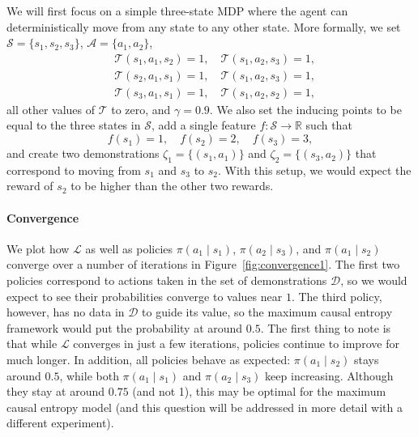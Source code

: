 \documentclass{mpaper}
\newcommand{\pione}{\pi(a_1 \mid s_1)}
\newcommand{\pitwo}{\pi(a_1 \mid s_2)}
\newcommand{\pithree}{\pi(a_2 \mid s_3)}
\begin{document}
We will first focus on a simple three-state MDP where the agent can
deterministically move from any state to any other state. More formally, we set
$\mathcal{S} = \{s_1, s_2, s_3 \}$, $\mathcal{A} = \{ a_1, a_2 \}$,
\begin{align*}
  &\mathcal{T}(s_1, a_1, s_2) = 1, \quad \mathcal{T}(s_1, a_2, s_3) = 1, \\
  &\mathcal{T}(s_2, a_1, s_1) = 1, \quad \mathcal{T}(s_1, a_2, s_3) = 1, \\
  &\mathcal{T}(s_3, a_1, s_1) = 1, \quad \mathcal{T}(s_1, a_2, s_2) = 1,
\end{align*}
all other values of $\mathcal{T}$ to zero, and $\gamma = 0.9$. We
also set the inducing points to be equal to the three states in $\mathcal{S}$,
add a single feature $f \colon \mathcal{S} \to \mathbb{R}$ such that
\[
  f(s_1) = 1, \quad f(s_2) = 2, \quad f(s_3) = 3,
\]
and create two demonstrations $\zeta_1 = \{ (s_1, a_1) \}$ and $\zeta_2 = \{
(s_3, a_2) \}$ that correspond to moving from $s_1$ and $s_3$ to $s_2$. With
this setup, we would expect the reward of $s_2$ to be higher than the other two
rewards.

\paragraph{Convergence}

We plot how $\mathcal{L}$ as well as policies $\pi(a_1 \mid s_1)$, $\pi(a_2 \mid
s_3)$, and $\pi(a_1 \mid s_2)$ converge over a number of iterations in
Figure~\ref{fig:convergence1}. The first two policies
correspond to actions taken in the set of demonstrations $\mathcal{D}$, so we
would expect to see their probabilities converge to values near $1$. The third
policy, however, has no data in $\mathcal{D}$ to guide its value, so the maximum
causal entropy framework would put the probability at around $0.5$. The first
thing to note is that while $\mathcal{L}$ converges in just a few iterations,
policies continue to improve for much longer. In addition, all policies behave
as expected: $\pitwo$ stays around $0.5$, while both $\pione$ and $\pithree$
keep increasing. Although they stay at around $0.75$ (and not 1), this may be
optimal for the maximum causal entropy model (and this question will be
addressed in more detail with a different experiment).
\end{document}
